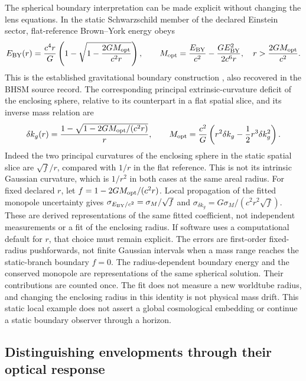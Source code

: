 The spherical boundary interpretation can be made explicit without
changing the lens equations. In the static Schwarzschild member of the
declared Einstein sector, flat-reference Brown--York energy obeys
\begin{equation}
 E_{\rm BY}(r)=\frac{c^4r}{G}
       \left(1-\sqrt{1-\frac{2GM_{\rm opt}}{c^2r}}\right),\qquad
 M_{\rm opt}=\frac{E_{\rm BY}}{c^2}
       -\frac{G E_{\rm BY}^2}{2c^6r},\quad
 r>\frac{2GM_{\rm opt}}{c^2}.
 \label{eq:bhsm-boundary-mass-interpretation}
\end{equation}
This is the established gravitational boundary construction
\cite{BrownYork1993}, also recovered in the BHSM source record.
The corresponding principal extrinsic-curvature deficit of the enclosing
sphere, relative to its counterpart in a flat spatial slice, and its
inverse mass relation are
\begin{equation}
 \delta k_g(r)=\frac{1-\sqrt{1-2GM_{\rm opt}/(c^2r)}}r,\qquad
 M_{\rm opt}=\frac{c^2}{G}
       \left(r^2\delta k_g-\frac12r^3\delta k_g^2\right).
 \label{eq:bhsm-curvature-mass-interpretation}
\end{equation}
Indeed the two principal curvatures of the enclosing sphere in the static
spatial slice are $\sqrt f/r$, compared with $1/r$ in the flat reference.
This is not its intrinsic Gaussian curvature, which is $1/r^2$ in both
cases at the same areal radius.
For fixed declared $r$, let $f=1-2GM_{\rm opt}/(c^2r)$. Local propagation
of the fitted monopole uncertainty gives
$\sigma_{E_{\rm BY}/c^2}=\sigma_M/\sqrt f$ and
$\sigma_{\delta k_g}=G\sigma_M/(c^2r^2\sqrt f)$.
These are derived representations of the same fitted coefficient, not
independent measurements or a fit of the enclosing radius. If software
uses a computational default for $r$, that choice must remain explicit.
The errors are first-order fixed-radius pushforwards, not finite Gaussian
intervals when a mass range reaches the static-branch boundary $f=0$.
The radius-dependent boundary energy and the conserved monopole are
representations of the same spherical solution. Their contributions
are counted once. The fit does not measure a new worldtube radius, and
changing the enclosing radius in this identity is not physical mass drift.
This static local example does not assert a global cosmological embedding
or continue a static boundary observer through a horizon.

\subsection{Distinguishing envelopments through their optical response}
\label{sec:envelopment-comparison}

